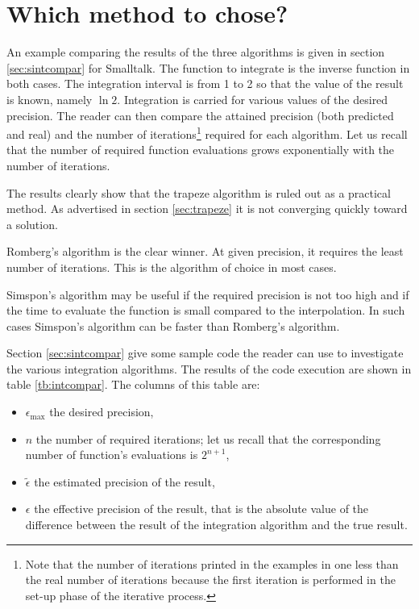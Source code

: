 \section{Which method to chose?}
\label{sec:intwhich} An example comparing the results of the three
algorithms is given in section \ref{sec:sintcompar} for Smalltalk.
The function to integrate is the inverse function in both cases. The integration
interval is from 1 to 2 so that the value of the result is known,
namely $\ln 2$. Integration is carried for various values of the
desired precision. The reader can then compare the attained
precision (both predicted and real) and the number of
iterations\footnote{Note that the number of iterations printed in
the examples in one less than the real number of iterations
because the first iteration is performed in the set-up phase of
the iterative process.} required for each algorithm. Let us recall
that the number of required function evaluations grows
exponentially with the number of iterations.

The results clearly show that the trapeze algorithm is ruled out
as a practical method. As advertised in section \ref{sec:trapeze}
it is not converging quickly toward a solution.

Romberg's algorithm is the clear winner. At given precision, it
requires the least number of iterations. This is the algorithm of
choice in most cases.

Simspon's algorithm may be useful if the required precision is not
too high and if the time to evaluate the function is small
compared to the interpolation. In such cases Simspon's algorithm
can be faster than Romberg's algorithm.

Section \ref{sec:sintcompar} give some sample code the reader can use to
investigate the various integration algorithms.
The results of the code execution are shown in table \ref{tb:intcompar}.
The columns of this table are:
\begin{itemize}
\item $\epsilon_{\mathop{\textrm{max}}}$ the desired precision,\\
\item $n$ the number of required iterations; let us recall that the
corresponding number of function's evaluations is $2^{n+1}$,\\
\item $\tilde{\epsilon}$ the estimated precision of the result,\\
\item $\epsilon$ the effective precision of the result, that is the absolute value
of the difference between the result of the integration algorithm and the true result.\\
\end{itemize}

